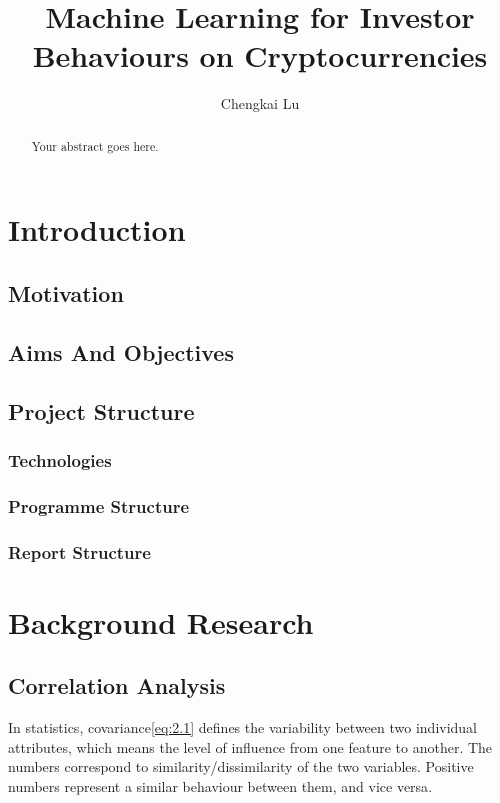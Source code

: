 \documentclass[11pt]{article} %
\title{Machine Learning for Investor Behaviours on Cryptocurrencies}
\author{Chengkai Lu}
\theoremstyle{plain}
\theoremstyle{definition}
\begin{document}
\maketitle

\declaration

\begin{abstract}
  Your abstract goes here.
\end{abstract}

\listoffigures
\listoftables

\clearpage

\section{Introduction}
\subsection{Motivation}
\subsection{Aims And Objectives}
\subsection{Project Structure}
\subsubsection{Technologies}
\subsubsection{Programme Structure}
\subsubsection{Report Structure}

\section{Background Research}
\subsection{Correlation Analysis}

In statistics, covariance\eqref{eq:2.1} defines the variability between two individual attributes, which means the level of influence from one feature to another. The numbers correspond to similarity/dissimilarity of the two variables. Positive numbers represent a similar behaviour between them, and vice versa\cite{wiki/cov:2018}.
\end{document}
